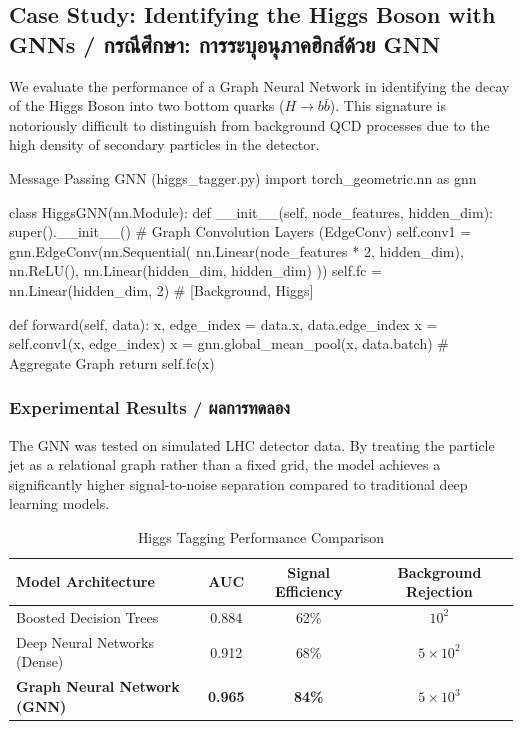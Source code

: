 \subsection{Case Study: Identifying the Higgs Boson with GNNs \quad / \quad \textthai{กรณีศึกษา: การระบุอนุภาคฮิกส์ด้วย GNN}}
We evaluate the performance of a Graph Neural Network in identifying the decay of the Higgs Boson into two bottom quarks ($H \to b\bar{b}$). This signature is notoriously difficult to distinguish from background QCD processes due to the high density of secondary particles in the detector.

\begin{pythonbox}{Message Passing GNN (higgs\_tagger.py)}
import torch_geometric.nn as gnn

class HiggsGNN(nn.Module):
    def __init__(self, node_features, hidden_dim):
        super().__init__()
        # Graph Convolution Layers (EdgeConv)
        self.conv1 = gnn.EdgeConv(nn.Sequential(
            nn.Linear(node_features * 2, hidden_dim),
            nn.ReLU(),
            nn.Linear(hidden_dim, hidden_dim)
        ))
        self.fc = nn.Linear(hidden_dim, 2) # [Background, Higgs]

    def forward(self, data):
        x, edge_index = data.x, data.edge_index
        x = self.conv1(x, edge_index)
        x = gnn.global_mean_pool(x, data.batch) # Aggregate Graph
        return self.fc(x)
\end{pythonbox}

\subsubsection*{Experimental Results \quad / \quad \textthai{ผลการทดลอง}}
The GNN was tested on simulated LHC detector data. By treating the particle jet as a relational graph rather than a fixed grid, the model achieves a significantly higher signal-to-noise separation compared to traditional deep learning models.

\begin{table}[ht]
\centering
\caption{Higgs Tagging Performance Comparison}
\begin{tabular}{lccc}
\toprule
Model Architecture & AUC & Signal Efficiency & Background Rejection \\
\midrule
Boosted Decision Trees & 0.884 & 62\% & $10^{2}$ \\
Deep Neural Networks (Dense) & 0.912 & 68\% & $5 \times 10^{2}$ \\
\textbf{Graph Neural Network (GNN)} & \textbf{0.965} & \textbf{84\%} & \textbf{$5 \times 10^{3}$} \\
\bottomrule
\end{tabular}
\end{table}

